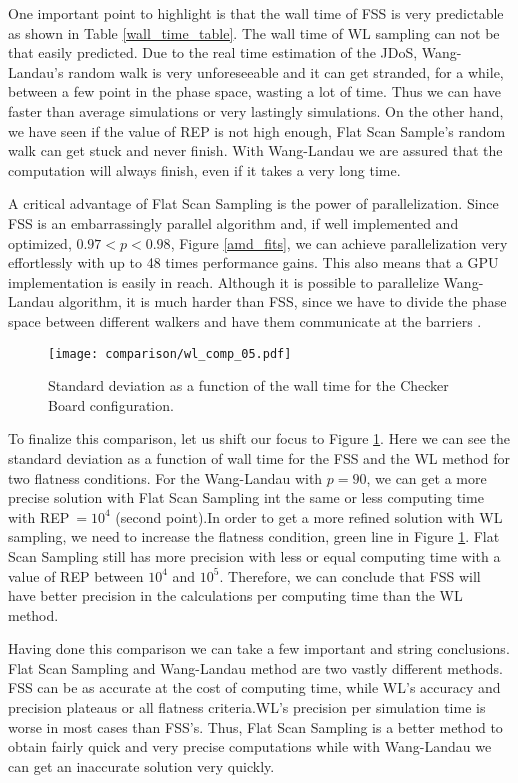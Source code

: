 	One important point to highlight is that the wall time of FSS is very predictable as shown in Table \ref{wall_time_table}. The wall time of WL sampling can not be that easily predicted. Due to the real time estimation of the JDoS, Wang-Landau's random walk is very unforeseeable and it can get stranded, for a while, between a few point in the phase space, wasting a lot of time. Thus we can have faster than average simulations or very lastingly simulations. 
	On the other hand, we have seen if the value of REP is not high enough, Flat Scan Sample's random walk can get stuck and never finish. With Wang-Landau we are assured that the computation will always finish, even if it takes a very long time.

	A critical advantage of Flat Scan Sampling is the power of parallelization. Since FSS is an embarrassingly parallel algorithm and, if well implemented and optimized, $0.97<p<0.98$, Figure \ref{amd_fits}, we can achieve parallelization very effortlessly with up to 48 times performance gains. This also means that a GPU implementation is easily in reach. Although it is possible to parallelize Wang-Landau algorithm, it is much harder than FSS, since we have to divide the phase space between different walkers and have them communicate at the barriers \cite{Yin2012}.

\begin{figure}[h]
	\centering
	\texttt{[image: comparison/wl\_comp\_05.pdf]}
	\caption{Standard deviation as a function of the wall time for the Checker Board configuration.}
	\label{time_std}
\end{figure}

	To finalize this comparison, let us shift our focus to Figure \ref{time_std}. Here we can see the standard deviation as a function of wall time for the FSS and the WL method for two flatness conditions. For the Wang-Landau with $p=90$, we can get a more precise solution with Flat Scan Sampling int the same or less computing time with REP$\ =10^4$ (second point).In order to get a more refined solution with WL sampling, we need to increase the flatness condition, green line in Figure \ref{time_std}. Flat Scan Sampling still has more precision with less or equal computing time with a value of REP between $10^4$ and $10^5$. Therefore,  we can conclude that FSS will have better precision in the calculations per computing time than the WL method.

	Having done this comparison we can take a few important and string conclusions. Flat Scan Sampling and Wang-Landau method are two vastly different methods. FSS can be as accurate at the cost of computing time, while WL's accuracy and precision plateaus or all flatness criteria.WL's precision per simulation time is worse in most cases than FSS's. Thus, Flat Scan Sampling is a better method to obtain fairly quick and very precise computations while with Wang-Landau we can get an inaccurate solution very quickly.









